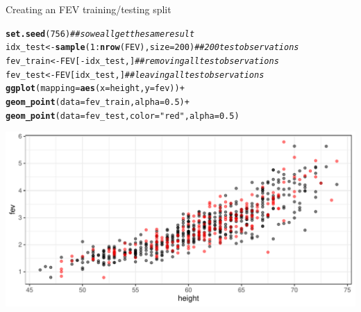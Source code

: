 \documentclass[table]{beamer}\usepackage[]{graphicx}\usepackage[]{color}
\makeatletter
\def\maxwidth{ %
  \ifdim\Gin@nat@width>\linewidth
    \linewidth
  \else
    \Gin@nat@width
  \fi
}
\newcommand{\hlnum}[1]{\textcolor[rgb]{0.686,0.059,0.569}{#1}}%
\newcommand{\hlstr}[1]{\textcolor[rgb]{0.192,0.494,0.8}{#1}}%
\newcommand{\hlcom}[1]{\textcolor[rgb]{0.678,0.584,0.686}{\textit{#1}}}%
\newcommand{\hlopt}[1]{\textcolor[rgb]{0,0,0}{#1}}%
\newcommand{\hlstd}[1]{\textcolor[rgb]{0.345,0.345,0.345}{#1}}%
\newcommand{\hlkwb}[1]{\textcolor[rgb]{0.69,0.353,0.396}{#1}}%
\newcommand{\hlkwc}[1]{\textcolor[rgb]{0.333,0.667,0.333}{#1}}%
\newcommand{\hlkwd}[1]{\textcolor[rgb]{0.737,0.353,0.396}{\textbf{#1}}}%
\newenvironment{kframe}{%
 \def\at@end@of@kframe{}%
 \ifinner\ifhmode%
  \def\at@end@of@kframe{\end{minipage}}%
  \begin{minipage}{\columnwidth}%
 \fi\fi%
 \def\FrameCommand##1{\hskip\@totalleftmargin \hskip-\fboxsep
 \colorbox{shadecolor}{##1}\hskip-\fboxsep
     \hskip-\linewidth \hskip-\@totalleftmargin \hskip\columnwidth}%
 \MakeFramed {\advance\hsize-\width
   \@totalleftmargin\z@ \linewidth\hsize
   \@setminipage}}%
 {\par\unskip\endMakeFramed%
 \at@end@of@kframe}
\newenvironment{knitrout}{}{} %
\makeatother
\begin{document}
\begin{frame}[fragile]{Creating an FEV training/testing split}

\scriptsize
\begin{knitrout}\footnotesize
{}\color{fgcolor}\begin{kframe}
\begin{alltt}
\hlkwd{set.seed}\hlstd{(}\hlnum{756}\hlstd{)}  \hlcom{## so we all get the same result}
\hlstd{idx_test} \hlkwb{<-} \hlkwd{sample}\hlstd{(}\hlnum{1}\hlopt{:}\hlkwd{nrow}\hlstd{(FEV),} \hlkwc{size}\hlstd{=}\hlnum{200}\hlstd{)} \hlcom{## 200 test observations}
\hlstd{fev_train} \hlkwb{<-} \hlstd{FEV[}\hlopt{-}\hlstd{idx_test,]}    \hlcom{## removing all test observations}
\hlstd{fev_test} \hlkwb{<-} \hlstd{FEV[idx_test,]}      \hlcom{## leaving all test observations}
\hlkwd{ggplot}\hlstd{(}\hlkwc{mapping} \hlstd{=} \hlkwd{aes}\hlstd{(}\hlkwc{x}\hlstd{=height,} \hlkwc{y}\hlstd{=fev))} \hlopt{+}
  \hlkwd{geom_point}\hlstd{(}\hlkwc{data}\hlstd{=fev_train,} \hlkwc{alpha}\hlstd{=}\hlnum{0.5}\hlstd{)} \hlopt{+}
  \hlkwd{geom_point}\hlstd{(}\hlkwc{data}\hlstd{=fev_test,} \hlkwc{color}\hlstd{=}\hlstr{"red"}\hlstd{,} \hlkwc{alpha}\hlstd{=}\hlnum{0.5}\hlstd{)}
\end{alltt}
\end{kframe}

{\centering \includegraphics[width=\maxwidth]{figs/beamer-unnamed-chunk-2-1} 

}


\end{knitrout}

\end{frame}
\end{document}
